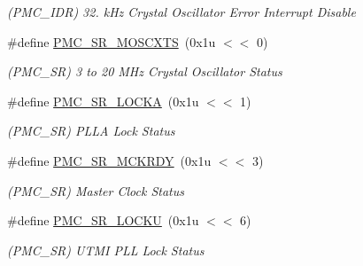 \begin{DoxyCompactItemize}
\begin{DoxyCompactList}\small\item\em (P\+M\+C\+\_\+\+I\+DR) 32. k\+Hz Crystal Oscillator Error Interrupt Disable \end{DoxyCompactList}\item 
\mbox{\label{group__SAMS70__PMC_ga8fc9ea4663e676dba2f1ce4025589743}} 
\#define \mbox{\hyperlink{group__SAMS70__PMC_ga8fc9ea4663e676dba2f1ce4025589743}{P\+M\+C\+\_\+\+S\+R\+\_\+\+M\+O\+S\+C\+X\+TS}}~(0x1u $<$$<$ 0)
\begin{DoxyCompactList}\small\item\em (P\+M\+C\+\_\+\+SR) 3 to 20 M\+Hz Crystal Oscillator Status \end{DoxyCompactList}\item 
\mbox{\label{group__SAMS70__PMC_ga67cebbfa3dfaf290083553d717b48101}} 
\#define \mbox{\hyperlink{group__SAMS70__PMC_ga67cebbfa3dfaf290083553d717b48101}{P\+M\+C\+\_\+\+S\+R\+\_\+\+L\+O\+C\+KA}}~(0x1u $<$$<$ 1)
\begin{DoxyCompactList}\small\item\em (P\+M\+C\+\_\+\+SR) P\+L\+LA Lock Status \end{DoxyCompactList}\item 
\mbox{\label{group__SAMS70__PMC_gae742c07d37e3011571a705ca768a5fee}} 
\#define \mbox{\hyperlink{group__SAMS70__PMC_gae742c07d37e3011571a705ca768a5fee}{P\+M\+C\+\_\+\+S\+R\+\_\+\+M\+C\+K\+R\+DY}}~(0x1u $<$$<$ 3)
\begin{DoxyCompactList}\small\item\em (P\+M\+C\+\_\+\+SR) Master Clock Status \end{DoxyCompactList}\item 
\mbox{\label{group__SAMS70__PMC_gad6d4d9511d87b4e9375d3773c2bf6715}} 
\#define \mbox{\hyperlink{group__SAMS70__PMC_gad6d4d9511d87b4e9375d3773c2bf6715}{P\+M\+C\+\_\+\+S\+R\+\_\+\+L\+O\+C\+KU}}~(0x1u $<$$<$ 6)
\begin{DoxyCompactList}\small\item\em (P\+M\+C\+\_\+\+SR) U\+T\+MI P\+LL Lock Status \end{DoxyCompactList}\item 
\mbox{\label{group__SAMS70__PMC_ga3457d80fc8da68f5e954ab338f49fa22}} 

\end{DoxyCompactItemize}

